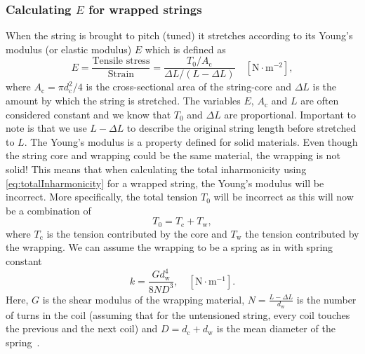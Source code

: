 \documentclass{article}
\begin{document}
\begin{sloppy}
\subsubsection{Calculating $E$ for wrapped strings}%
%
When the string is brought to pitch (tuned) it stretches according to its Young's modulus (or elastic modulus) $E$ which is defined as
%
\begin{equation}\label{eq:tensile_stress}
    E = \frac{\text{Tensile stress}}{\text{Strain}}
    = \frac{T_0/A_\text{c}}{\Delta L/(L - \Delta L)} \quad [\text{N}\cdot\text{m}^{-2}], 
\end{equation}
%
where $A_\text{c} = \pi d_\text{c}^2/4$ is the cross-sectional area of the string-core and $\Delta L$ is the amount by which the string is stretched. The variables $E$, $A_\text{c}$ and $L$ are often considered constant and we know that $T_0$ and $\Delta L$ are proportional. Important to note is that we use $L - \Delta L$ to describe the original string length before stretched to $L$. The Young's modulus is a property defined for solid materials. Even though the string core and wrapping could be the same material, the wrapping is not solid! This means that when calculating the total inharmonicity using \eqref{eq:totalInharmonicity} for a wrapped string, the Young's modulus will be incorrect. %
More specifically, the total tension $T_0$ will be incorrect as this will now be a combination of
\begin{equation}\label{eq:totalTension}
    T_0 = T_\text{c} + T_\text{w},
\end{equation}
where $T_\text{c}$ is the tension contributed by the core and $T_\text{w}$ the tension contributed by the wrapping. %
%
We can assume the wrapping to be a spring as in \cite{kemp:wound_and_unwound_strings} with spring constant~\cite{childs:mechanical_engineering}
%
\begin{equation}\label{eq:k_wrapping}
    k = \frac{Gd_\text{w}^4}{8ND^3}, \quad [\text{N}\cdot\text{m}^{-1}].
\end{equation}
%
Here, $G$ is the shear modulus of the wrapping material, $N = \frac{L - \Delta L}{d_\text{w}}$ is the number of turns in the coil (assuming that for the untensioned string, every coil touches the previous and the next coil) and $D = d_\text{c}+d_\text{w}$ is the mean diameter of the spring~\cite{kemp:wound_and_unwound_strings}.

\end{sloppy}
\end{document}
